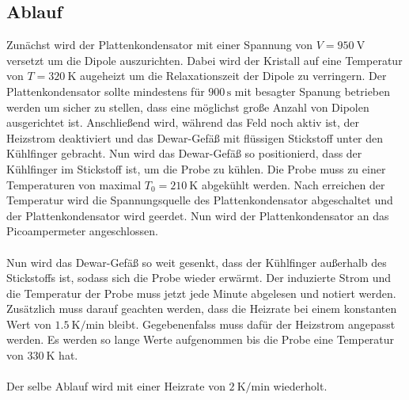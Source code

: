 \subsection{Ablauf}
Zunächst wird der Plattenkondensator mit einer Spannung von $V = \SI{950}{\V}$ versetzt um die Dipole auszurichten.
Dabei wird der Kristall auf eine Temperatur von $T = \SI{320}{\K}$ augeheizt um die Relaxationszeit der Dipole zu verringern.
Der Plattenkondensator sollte mindestens für $900\,\si{\second}$ mit besagter Spanung betrieben werden um sicher zu stellen, dass eine möglichst große Anzahl von Dipolen ausgerichtet ist.
Anschließend wird, während das Feld noch aktiv ist, der Heizstrom deaktiviert und das Dewar-Gefäß mit flüssigen Stickstoff unter den Kühlfinger gebracht.
Nun wird das Dewar-Gefäß so positionierd, dass der Kühlfinger im Stickstoff ist, um die Probe zu kühlen.
Die Probe muss zu einer Temperaturen von maximal $T_0 = \SI{210}{\K}$ abgekühlt werden.
Nach erreichen der Temperatur wird die Spannungsquelle des Plattenkondensator abgeschaltet und der Plattenkondensator wird geerdet.
Nun wird der Plattenkondensator an das Picoampermeter angeschlossen.
\\\\
Nun wird das Dewar-Gefäß so weit gesenkt, dass der Kühlfinger außerhalb des Stickstoffs ist, sodass sich die Probe wieder erwärmt.
Der induzierte Strom und die Temperatur der Probe muss jetzt jede Minute abgelesen und notiert werden.
Zusätzlich muss darauf geachten werden, dass die Heizrate bei einem konstanten Wert von $\SI{1.5}{\K \per \minute}$ bleibt.
Gegebenenfalss muss dafür der Heizstrom angepasst werden.
Es werden so lange Werte aufgenommen bis die Probe eine Temperatur von $\SI{330}{\K}$ hat.
\\\\
Der selbe Ablauf wird mit einer Heizrate von $\SI{2}{\K \per \minute}$ wiederholt.
